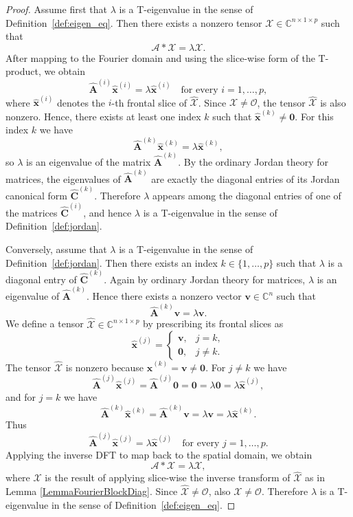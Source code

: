 \documentclass[pdflatex,sn-mathphys-ay]{sn-jnl}
\newcommand{\T}[1]{\mathcal{#1}}    %
\newcommand{\V}[1]{\bm{#1}}     %
\newcommand{\M}[1]{\bm{#1}}     %
\newcommand{\C}{\mathbb{C}}         %
\theoremstyle{thmstyleone}
\theoremstyle{thmstyletwo}
\theoremstyle{thmstylethree}
\numberwithin{equation}{section}
\begin{document}
\begin{proof}
Assume first that $\lambda$ is a T-eigenvalue in the sense of Definition~\ref{def:eigen_eq}. Then there exists a nonzero tensor $\T{X} \in \C^{n\times 1\times p}$ such that
$$
\T{A} * \T{X} = \lambda \T{X}.
$$
After mapping to the Fourier domain and using the slice-wise form of the T-product, we obtain
$$
\widehat{\M{A}}^{(i)}\widehat{\V{x}}^{(i)} = \lambda \widehat{\V{x}}^{(i)}
\quad \text{for every } i=1,\dots,p,
$$
where $\widehat{\V{x}}^{(i)}$ denotes the $i$-th frontal slice of $\widehat{\T{X}}$. Since $\T{X}\neq \T{O}$, the tensor $\widehat{\T{X}}$ is also nonzero. Hence, there exists at least one index $k$ such that $\widehat{\V{x}}^{(k)} \neq \V{0}$. For this index $k$ we have
$$
\widehat{\M{A}}^{(k)}\widehat{\V{x}}^{(k)} = \lambda \widehat{\V{x}}^{(k)},
$$
so $\lambda$ is an eigenvalue of the matrix $\widehat{\M{A}}^{(k)}$. By the ordinary Jordan theory for matrices, the eigenvalues of $\widehat{\M{A}}^{(k)}$ are exactly the diagonal entries of its Jordan canonical form $\widehat{\M{C}}^{(k)}$. Therefore $\lambda$ appears among the diagonal entries of one of the matrices $\widehat{\M{C}}^{(i)}$, and hence $\lambda$ is a T-eigenvalue in the sense of Definition~\ref{def:jordan}.

Conversely, assume that $\lambda$ is a T-eigenvalue in the sense of Definition~\ref{def:jordan}. Then there exists an index $k \in \{1,\dots,p\}$ such that $\lambda$ is a diagonal entry of $\widehat{\M{C}}^{(k)}$. Again by ordinary Jordan theory for matrices, $\lambda$ is an eigenvalue of $\widehat{\M{A}}^{(k)}$. Hence there exists a nonzero vector $\V{v} \in \C^n$ such that
$$
\widehat{\M{A}}^{(k)}\V{v} = \lambda \V{v}.
$$
We define a tensor $\widehat{\T{X}} \in \C^{n\times 1\times p}$ by prescribing its frontal slices as
$$
\widehat{\V{x}}^{(j)} =
\begin{cases}
\V{v}, & j=k,\\
\V{0}, & j\neq k.
\end{cases}
$$
The tensor $\widehat{\T{X}}$ is nonzero because $\widehat{\V{x}}^{(k)} = \V{v}\neq \V{0}$. For $j\neq k$ we have
$$
\widehat{\M{A}}^{(j)}\widehat{\V{x}}^{(j)}
=
\widehat{\M{A}}^{(j)}\V{0}
=
\V{0}
=
\lambda \V{0}
=
\lambda \widehat{\V{x}}^{(j)},
$$
and for $j=k$ we have
$$
\widehat{\M{A}}^{(k)}\widehat{\V{x}}^{(k)}
=
\widehat{\M{A}}^{(k)}\V{v}
=
\lambda \V{v}
=
\lambda \widehat{\V{x}}^{(k)}.
$$
Thus
$$
\widehat{\M{A}}^{(j)}\widehat{\V{x}}^{(j)} = \lambda \widehat{\V{x}}^{(j)}
\quad \text{for every } j=1,\dots,p.
$$
Applying the inverse DFT to map back to the spatial domain, we obtain
$$
\T{A} * \T{X} = \lambda \T{X},
$$
where $\T{X}$ is the result of applying slice-wise the inverse transform of $\widehat{\T{X}}$ as in Lemma \ref{LemmaFourierBlockDiag}. 
Since $\widehat{\T{X}}\neq \T{O}$, also $\T{X}\neq \T{O}$. Therefore $\lambda$ is a T-eigenvalue in the sense of Definition~\ref{def:eigen_eq}.
\end{proof}
\end{document}

